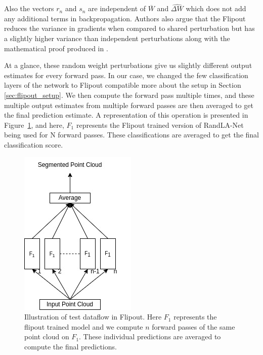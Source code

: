 Also the vectors $r_n$ and $s_n$ are independent of $\overline{W}$ and $\widehat{\Delta W}$ which does not add any additional terms in backpropagation.
Authors also argue that the Flipout reduces the variance in gradients when compared to shared perturbation but has a slightly higher variance than independent perturbations along with the mathematical proof produced in \cite{Flipout}.


At a glance, these random weight perturbations give us slightly different output estimates for every forward pass.
In our case, we changed the few classification layers of the network to Flipout compatible more about the setup in Section \ref{sec:flipout_setup}.
We then compute the forward pass multiple times, and these multiple output estimates from multiple forward passes are then averaged to get the final prediction estimate.
A representation of this operation is presented in Figure~\ref{fig:flipout_ex}, and here, $F_1$ represents the Flipout trained version of RandLA-Net being used for N forward passes.
These classifications are averaged to get the final classification score.

\begin{figure}
    \centering
    \includegraphics[scale=0.5]{images/flipout.jpg}
    \caption{Illustration of test dataflow in Flipout. Here $F_1$ represents the flipout trained model and we compute $n$ forward passes of the same point cloud on $F_1$.
    These individual predictions are averaged to compute the final predictions.}
    \label{fig:flipout_ex}
\end{figure}
\FloatBarrier

